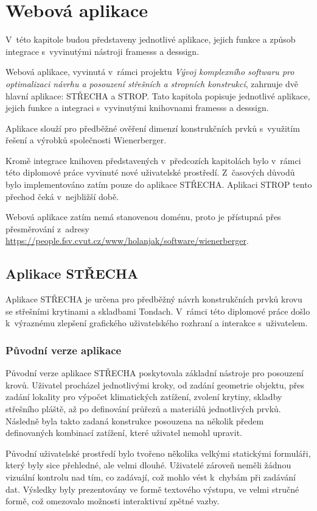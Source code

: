 \chapter{Webová aplikace}
V~této kapitole budou představeny jednotlivé aplikace, jejich funkce a způsob integrace s~vyvinutými nástroji framesss a desssign.

Webová aplikace, vyvinutá v~rámci projektu \textit{Vývoj komplexního softwaru pro optimalizaci návrhu a posouzení střešních a stropních konstrukcí}, zahrnuje dvě hlavní aplikace: STŘECHA a STROP. Tato kapitola popisuje jednotlivé aplikace, jejich funkce a integraci s~vyvinutými knihovnami framesss a desssign.

Aplikace slouží pro předběžné ověření dimenzí konstrukčních prvků s~využitím řešení a výrobků společnosti Wienerberger.

Kromě integrace knihoven představených v~předcozích kapitolách bylo v~rámci této diplomové práce vyvinuté nové uživatelské prostředí. Z~časových důvodů bylo implementováno zatím pouze do aplikace STŘECHA. Aplikaci STROP tento přechod čeká v~nejbližší době.

Webová aplikace zatím nemá stanovenou doménu, proto je přístupná přes přesměrování z~adresy \url{https://people.fsv.cvut.cz/www/holanjak/software/wienerberger}.

\section{Aplikace STŘECHA}
Aplikace STŘECHA je určena pro předběžný návrh konstrukčních prvků krovu se střešními krytinami a skladbami Tondach. V~rámci této diplomové práce došlo k~výraznému zlepšení grafického uživatelského rozhraní a interakce s~uživatelem.

\subsection{Původní verze aplikace}
Původní verze aplikace STŘECHA poskytovala základní nástroje pro posouzení krovů. Uživatel procházel jednotlivými kroky, od zadání geometrie objektu, přes zadání lokality pro výpočet klimatických zatížení, zvolení krytiny, skladby střešního pláště, až po definování průřezů a materiálů jednotlivých prvků. Následně byla takto zadaná konstrukce posouzena na několik předem definovaných kombinací zatížení, které uživatel nemohl upravit.

Původní uživatelské prostředí bylo tvořeno několika velkými statickými formuláři, který byly sice přehledné, ale velmi dlouhé. Uživatelé zároveň neměli žádnou vizuální kontrolu nad tím, co zadávají, což mohlo vést k~chybám při zadávání dat. Výsledky byly prezentovány ve formě textového výstupu, ve velmi stručné formě, což omezovalo možnosti interaktivní zpětné vazby.

